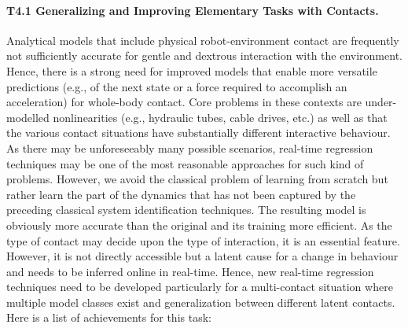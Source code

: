 \documentclass[12pt,a4paper,twoside]{report}
\begin{document}
\paragraph{T4.1 Generalizing and Improving Elementary Tasks with Contacts.} 
Analytical models that include physical robot-environment contact are frequently not sufficiently accurate
for gentle and dextrous interaction with the environment. Hence, there is a strong need for improved
models that enable more versatile predictions (e.g., of the next state or a force required to accomplish an
acceleration) for whole-body contact. Core problems in these contexts are under-modelled nonlinearities
(e.g., hydraulic tubes, cable drives, etc.) as well as that the various contact situations have substantially
different interactive behaviour. As there may be unforeseeably many possible scenarios, real-time
regression techniques may be one of the most reasonable approaches for such kind of problems. However,
we avoid the classical problem of learning from scratch but rather learn the part of the dynamics that has
not been captured by the preceding classical system identification techniques. The resulting model is
obviously more accurate than the original and its training more efficient. As the type of contact may decide
upon the type of interaction, it is an essential feature. However, it is not directly accessible but a latent
cause for a change in behaviour and needs to be inferred online in real-time. Hence, new real-time
regression techniques need to be developed particularly for a multi-contact situation where multiple model
classes exist and generalization between different latent contacts. Here is a list of achievements for this task:
\end{document}
